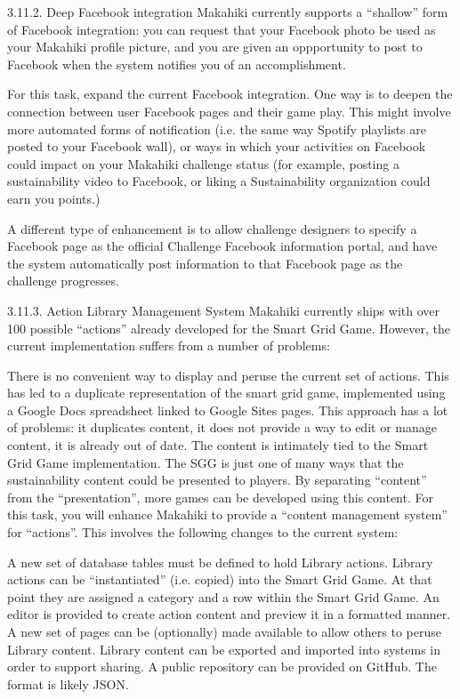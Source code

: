 3.11.2. Deep Facebook integration
Makahiki currently supports a “shallow” form of Facebook integration: you can request that your Facebook photo be used as your Makahiki profile picture, and you are given an oppportunity to post to Facebook when the system notifies you of an accomplishment.

For this task, expand the current Facebook integration. One way is to deepen the connection between user Facebook pages and their game play. This might involve more automated forms of notification (i.e. the same way Spotify playlists are posted to your Facebook wall), or ways in which your activities on Facebook could impact on your Makahiki challenge status (for example, posting a sustainability video to Facebook, or liking a Sustainability organization could earn you points.)

A different type of enhancement is to allow challenge designers to specify a Facebook page as the official Challenge Facebook information portal, and have the system automatically post information to that Facebook page as the challenge progresses.

3.11.3. Action Library Management System
Makahiki currently ships with over 100 possible “actions” already developed for the Smart Grid Game. However, the current implementation suffers from a number of problems:

There is no convenient way to display and peruse the current set of actions. This has led to a duplicate representation of the smart grid game, implemented using a Google Docs spreadsheet linked to Google Sites pages. This approach has a lot of problems: it duplicates content, it does not provide a way to edit or manage content, it is already out of date.
The content is intimately tied to the Smart Grid Game implementation. The SGG is just one of many ways that the sustainability content could be presented to players. By separating “content” from the “presentation”, more games can be developed using this content.
For this task, you will enhance Makahiki to provide a “content management system” for “actions”. This involves the following changes to the current system:

A new set of database tables must be defined to hold Library actions.
Library actions can be “instantiated” (i.e. copied) into the Smart Grid Game. At that point they are assigned a category and a row within the Smart Grid Game.
An editor is provided to create action content and preview it in a formatted manner.
A new set of pages can be (optionally) made available to allow others to peruse Library content.
Library content can be exported and imported into systems in order to support sharing. A public repository can be provided on GitHub. The format is likely JSON.